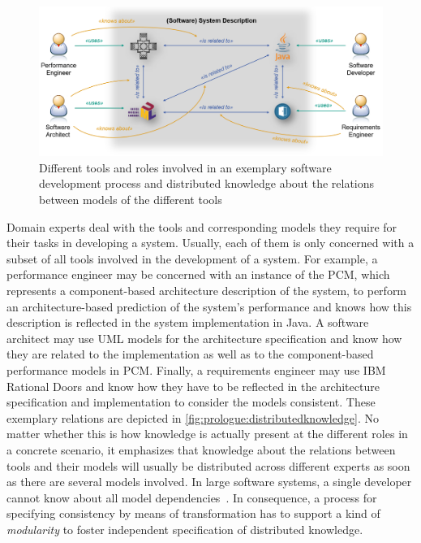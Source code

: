 \begin{figure}
    \centering
    \includegraphics[width=\textwidth]{figures/prologue/distributed_knowledge.png}
    \caption{Different tools and roles involved in an exemplary software development process and distributed knowledge about the relations between models of the different tools}
    \label{fig:prologue:distributedknowledge}
\end{figure}

Domain experts deal with the tools and corresponding models they require for their tasks in developing a system.
Usually, each of them is only concerned with a subset of all tools involved in the development of a system.
For example, a performance engineer may be concerned with an instance of the \gls{PCM}, which represents a component-based architecture description of the system, to perform an architecture-based prediction of the system's performance and knows how this description is reflected in the system implementation in Java.
A software architect may use \gls{UML} models for the architecture specification and know how they are related to the implementation as well as to the component-based performance models in \gls{PCM}.
Finally, a requirements engineer may use IBM Rational Doors and know how they have to be reflected in the architecture specification and implementation to consider the models consistent.
These exemplary relations are depicted in \autoref{fig:prologue:distributedknowledge}.
No matter whether this is how knowledge is actually present at the different roles in a concrete scenario, it emphasizes that knowledge about the relations between tools and their models will usually be distributed across different experts as soon as there are several models involved.
In large software systems, a single developer cannot know about all model dependencies~\cite{petrenko2008a}.
In consequence, a process for specifying consistency by means of transformation has to support a kind of \emph{modularity} to foster independent specification of distributed knowledge.

